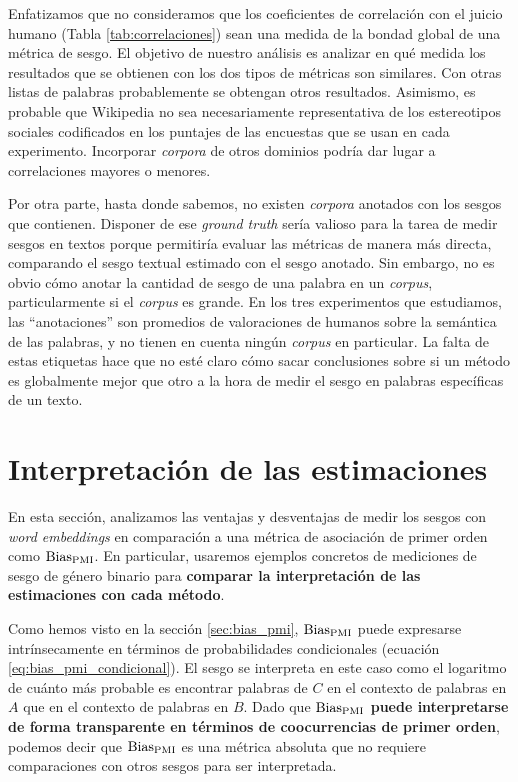 Enfatizamos que no consideramos que los coeficientes de correlación con el juicio humano (Tabla \ref{tab:correlaciones}) sean una medida de la bondad global de una métrica de sesgo. El objetivo de nuestro análisis es analizar en qué medida los resultados que se obtienen con los dos tipos de métricas son similares. Con otras listas de palabras probablemente se obtengan otros resultados. Asimismo, es probable que Wikipedia no sea necesariamente representativa de los estereotipos sociales codificados en los puntajes de las encuestas que se usan en cada experimento. Incorporar \emph{corpora} de otros dominios podría dar lugar a correlaciones mayores o menores. 

Por otra parte, hasta donde sabemos, no existen \emph{corpora} anotados con los sesgos que contienen. Disponer de ese \emph{ground truth} sería valioso para la tarea de medir sesgos en textos porque permitiría evaluar las métricas de manera más directa, comparando el sesgo textual estimado con el sesgo anotado. Sin embargo, no es obvio cómo anotar la cantidad de sesgo de una palabra en un \emph{corpus}, particularmente si el \emph{corpus} es grande. En los tres experimentos que estudiamos, las ``anotaciones'' son promedios de valoraciones de humanos sobre la semántica de las palabras, y no tienen en cuenta ningún \emph{corpus} en particular. La falta de estas etiquetas hace que no esté claro cómo sacar conclusiones sobre si un método es globalmente mejor que otro a la hora de medir el sesgo en palabras específicas de un texto.


\section{Interpretación de las estimaciones} \label{sec:experimento_interpretabilidad}

En esta sección, analizamos las ventajas y desventajas de medir los sesgos con \emph{word embeddings} en comparación a una métrica de asociación de primer orden como $\operatorname{Bias_{PMI}}$. En particular, usaremos ejemplos concretos de mediciones de sesgo de género binario para \textbf{comparar la interpretación de las estimaciones con cada método}.

Como hemos visto en la sección \ref{sec:bias_pmi}, $\operatorname{Bias_{PMI}}$ puede expresarse intrínsecamente en términos de probabilidades condicionales (ecuación \ref{eq:bias_pmi_condicional}). El sesgo se interpreta en este caso como el logaritmo de cuánto más probable es encontrar palabras de $C$ en el contexto de palabras en $A$ que en el contexto de palabras en $B$. Dado que \textbf{$\operatorname{Bias_{PMI}}$ puede interpretarse de forma transparente en términos de coocurrencias de primer orden}, podemos decir que $\operatorname{Bias_{PMI}}$ es una métrica absoluta que no requiere comparaciones con otros sesgos para ser interpretada. 

